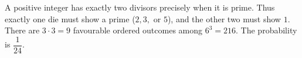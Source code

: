 A positive integer has exactly two divisors precisely when it is prime. Thus exactly one die must show a prime ($2,3,$ or $5$), and the other two must show $1$. There are $3\cdot3=9$ favourable ordered outcomes among $6^3=216$. The probability is $\boxed{\dfrac{1}{24}}$.
